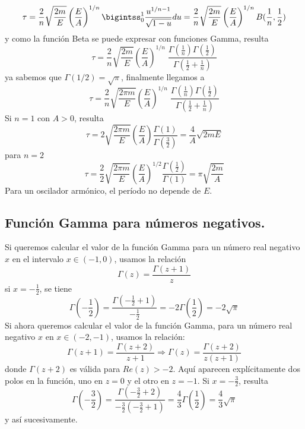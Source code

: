 \[ \tau = \dfrac{2}{n} \sqrt{\dfrac{2m}{E}} \left( \dfrac{E}{A} \right)^{1/n} \bigintss_{0}^{1} \dfrac{u^{1/n -1}}{\sqrt{1 - u}} du  = \dfrac{2}{n} \sqrt{\dfrac{2m}{E}} \left( \dfrac{E}{A} \right)^{1/n} B(\dfrac{1}{n}, \dfrac{1}{2}) \]
y como la función Beta se puede expresar con funciones Gamma, resulta
\[ \tau = \dfrac{2}{n} \sqrt{\dfrac{2m}{E}} \left( \dfrac{E}{A} \right)^{1/n} \; \dfrac{\Gamma \left( \frac{1}{n} \right) \Gamma \left( \frac{1}{2} \right) }{\Gamma \left( \frac{1}{2} + \frac{1}{n} \right)} \]
ya sabemos que $\Gamma (1/2) = \sqrt{\pi}$, finalmente llegamos a
\[ \tau = \dfrac{2}{n} \sqrt{\dfrac{2 \pi m}{E}} \left( \dfrac{E}{A} \right)^{1/n} \; \dfrac{\Gamma \left( \frac{1}{n} \right) \Gamma \left( \frac{1}{2} \right) }{\Gamma \left( \frac{1}{2} + \frac{1}{n} \right)} \]
Si $n = 1 \mbox{ con } A > 0$, resulta
\[ \tau = 2 \sqrt{\dfrac{2 \pi m }{E}} \left( \dfrac{E}{A} \right) \dfrac{\Gamma (1)}{\Gamma (\frac{3}{2})} =  \dfrac{4}{A} \sqrt{2mE} \]
para $n = 2$
\[ \tau = \dfrac{2}{2} \sqrt{\dfrac{2 \pi m }{E}} \left( \dfrac{E}{A} \right)^{1/2} \dfrac{\Gamma (\frac{1}{2})}{\Gamma (1)}  =  \pi \sqrt{\dfrac{2m}{A}} \]
Para un oscilador armónico, el período no depende de $E$.
\subsection{Función Gamma para números negativos.}
Si queremos calcular el valor de la función Gamma para un número real negativo $x$ en el intervalo $x \in (-1, 0)$, usamos la relación
\[ \Gamma (z) = \dfrac{\Gamma (z+1)}{z} \]
si  $x = - \frac{1}{2}$, se tiene
\[ \Gamma \left( - \dfrac{1}{2} \right) = \dfrac{\Gamma \left( - \frac{1}{2} + 1 \right) }{- \frac{1}{2}} =  - 2 \Gamma \left( \dfrac{1}{2} \right) = - 2  \sqrt{\pi} \]
Si ahora queremos calcular el valor de la función Gamma, para un número real negativo $x$ en $x \in (-2, -1)$, usamos la relación:
\[ \Gamma (z + 1) = \dfrac{\Gamma (z + 2)}{z + 1} \Rightarrow \Gamma (z) = \dfrac{\Gamma (z + 2)}{z (z + 1)} \]
donde $\Gamma (z + 2) $ es válida para $Re(z) > -2$. Aquí aparecen explícitamente dos polos en la función, uno en $z=0$ y el otro en $z=-1$.
Si $x = - \frac{3}{2}$, resulta
\[ \Gamma \left( - \dfrac{3}{2} \right) = \dfrac{\Gamma \left( - \frac{3}{2} + 2 \right) }{- \frac{3}{2} (- \frac{3}{2} +  1)} =  \dfrac{4}{3} \Gamma \left( \dfrac{1}{2} \right) = \dfrac{4}{3} \sqrt{\pi } \]
y así sucesivamente.

